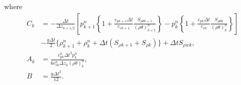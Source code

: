 where
\begin{align}
  C_k
  &= -\frac{\Delta t}{\Delta z_{k+1/2}}\left[
    p_{k+1}^n\left\{1+\frac{c_{p k+1}\Delta t}{c_{v k+1}}\frac{S_{\rho\theta k+1}}{(\rho\theta)_{k+1}^n}\right\}
  - p_k^n   \left\{1+\frac{c_{p k}\Delta t}{c_{v k}}\frac{S_{\rho\theta k}  }{(\rho\theta)_k^n   }\right\}
    \right] \nonumber \\
  & - \frac{g\Delta t}{2}\{\rho_{k+1}^n+\rho_k^n+\Delta t(S_{\rho k+1}+S_{\rho k})\}
  + \Delta t S_{\rho w k}, \\
  A_k &= \frac{c_{p k}^n\Delta t^2 p_k^n   }{6c_{v k}^n\Delta z_{k} (\rho\theta)_k^n}, \\
  B &= \frac{g\Delta t^2}{12}.
\end{align}
